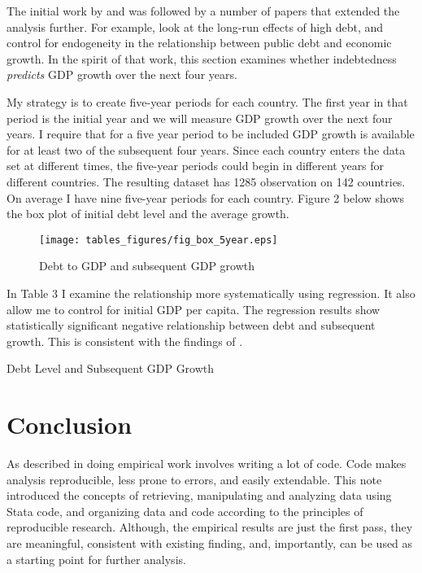\documentclass[letterpaper,11pt]{article}
\begin{document}
The initial work by \cite{reinhartrogoffAER2010} and \cite{herndon2014does} was followed by a number of papers that extended the analysis further. For example, \cite{eberhardt2015public} look at the long-run effects of high debt, and \cite{panizza2014public} control for endogeneity in the relationship between public debt and economic growth. In the spirit of that work, this section  examines whether indebtedness \emph{predicts} GDP growth over the next four years.  

My strategy is to create five-year periods for each country. The first year in that period is the initial year and we will measure GDP growth over the next four years. I require that for a five year period to be included GDP growth is available for at least two of the subsequent four years. Since each country enters the data set at different times, the five-year periods could begin in different years for different countries. The resulting dataset has 1285 observation on 142 countries. On average I have nine five-year periods for each country. Figure 2 below shows the box plot of initial debt level and the average growth.

\begin{figure}[h!]
	\centering
	\texttt{[image: tables\_figures/fig\_box\_5year.eps]}
	\caption{Debt to GDP and subsequent GDP growth}
\end{figure}

In Table 3 I examine the relationship more systematically using regression. It also allow me to control for initial GDP per capita. The regression results show statistically significant negative relationship between debt and subsequent growth. This is consistent with the findings of \cite{eberhardt2015public}. 

\begin{table}[h!] \centering
\caption{Debt Level and Subsequent GDP Growth}
 
\end{table}


\section{Conclusion}

As described in  \cite{gentzkow2014code} doing empirical work involves writing a lot of code. Code makes analysis reproducible, less prone to errors, and easily extendable. This note introduced the concepts of retrieving, manipulating and analyzing data using Stata code, and organizing data and code according to the principles of reproducible research. Although, the empirical results are just the first pass, they are meaningful, consistent with existing finding, and, importantly, can be used as a starting point for further analysis. 



\end{document}

